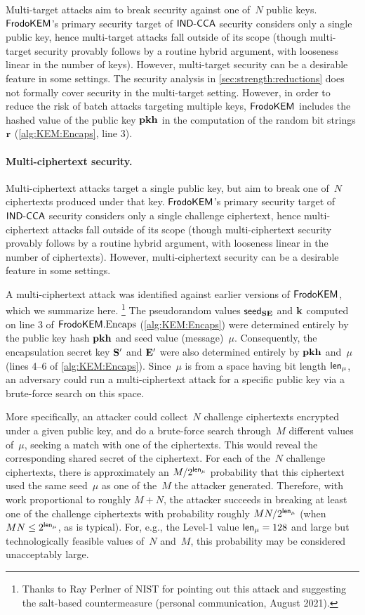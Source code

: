 \documentclass{iacrcc}
\begin{document}
Multi-target attacks aim to break security against one of~$N$ public keys.
$\textsf{\upshape\mdseries FrodoKEM}$'s primary security target of $\textsf{\upshape\mdseries IND-CCA}$ security considers only a single public key, hence multi-target attacks fall outside of its scope (though multi-target security provably follows by a routine hybrid argument, with looseness linear in the number of keys).
However, multi-target security can be a desirable feature in some settings.
The security analysis in \autoref{sec:strength:reductions} does not formally cover security in the multi-target setting.
However, in order to reduce the risk of batch attacks targeting multiple keys, $\textsf{\upshape\mdseries FrodoKEM}$ includes the hashed value of the public key $\mathbf{p}\mathbf{k}\mathbf{h}$ in the computation of the random bit strings $\mathbf{r}$ (\autoref{alg:KEM:Encaps}, line 3).

\paragraph{Multi-ciphertext security.}

Multi-ciphertext attacks target a single public key, but aim to break one of~$N$ ciphertexts produced under that key.
$\textsf{\upshape\mdseries FrodoKEM}$'s primary security target of $\textsf{\upshape\mdseries IND-CCA}$ security considers only a single challenge ciphertext, hence multi-ciphertext attacks fall outside of its scope (though multi-ciphertext security provably follows by a routine hybrid argument, with looseness linear in the number of ciphertexts).
However, multi-ciphertext security can be a desirable feature in some settings.

A multi-ciphertext attack was identified against earlier versions of $\textsf{\upshape\mdseries FrodoKEM}$, which we summarize here.%
\footnote{Thanks to Ray Perlner of NIST for pointing out this attack and suggesting the salt-based countermeasure (personal communication, August 2021).}
The pseudorandom values ${\mathsf{seed}_{\mathbf{S}\mathbf{E}}}$ and $\mathbf{k}$ computed on line 3 of $\textsf{\upshape\mdseries FrodoKEM}.\textrm{\upshape\mdseries Encaps}$ (\autoref{alg:KEM:Encaps}) were determined entirely by the public key hash $\mathbf{p}\mathbf{k}\mathbf{h}$ and seed value (message)~$\mu$.
Consequently, the encapsulation secret key $\mathbf{S}'$ and $\mathbf{E}'$ were also determined entirely by $\mathbf{p}\mathbf{k}\mathbf{h}$ and~$\mu$ (lines 4--6 of \autoref{alg:KEM:Encaps}).
Since~$\mu$ is from a space having bit length ${\mathsf{len}_{\mu}}$, an adversary could run a multi-ciphertext attack for a specific public key via a brute-force search on this space.

More specifically, an attacker could collect~$N$ challenge ciphertexts encrypted under a given public key, and do a brute-force search through~$M$ different values of~$\mu$, seeking a match with one of the ciphertexts.
This would reveal the corresponding shared secret of the ciphertext.
For each of the~$N$ challenge ciphertexts, there is approximately an $M/2^{{\mathsf{len}_{\mu}}}$ probability that this ciphertext used the same seed~$\mu$ as one of the~$M$ the attacker generated.
Therefore, with work proportional to roughly $M+N$, the attacker succeeds in breaking at least one of the challenge ciphertexts with probability roughly $M N /2^{{\mathsf{len}_{\mu}}}$ (when $M N \leq 2^{{\mathsf{len}_{\mu}}}$, as is typical).
For, e.g., the Level-1 value ${\mathsf{len}_{\mu}} = 128$ and large but technologically feasible values of~$N$ and~$M$, this probability may be considered unacceptably large.
\end{document}

